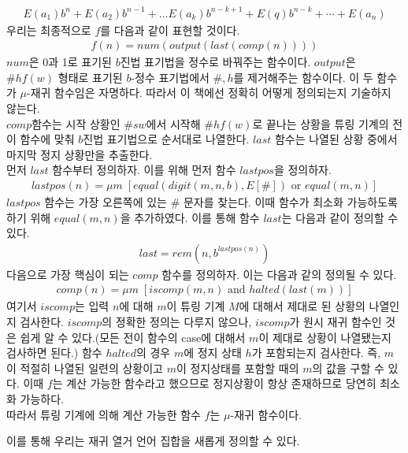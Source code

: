\documentclass[b5paper, 11pt]{book}
\theoremstyle{definition}
\newenvironment{pf*}{\pushQED{\qed}\pf}
{\popQED\endpf}
\begin{document}
\begin{pf*}
    \begin{align*}
        E(a_1)b^n + E(a_2)b^{n-1} + \ldots E(a_k)b^{n-k+1} + E(q)b^{n-k} + \cdots + E(a_n)
    \end{align*}
    우리는 최종적으로 $f$를 다음과 같이 표현할 것이다.
    \begin{align*}
        f(n) = num(output(last(comp(n))))
    \end{align*}
    $num$은 0과 1로 표기된 $b$진법 표기법을 정수로 바꿔주는 함수이다. 
    $output$은 $\# h f(w)$ 형태로 표기된 $b$-정수 표기법에서 $\#, h$를 제거해주는 함수이다.
    이 두 함수가 $\mu$-재귀 함수임은 자명하다. 따라서 이 책에선 정확히 어떻게 정의되는지 기술하지 않는다.\\ 
    $comp$함수는 시작 상황인 $\# s w$에서 시작해 $\# h f(w)$로 끝나는 상황을 튜링 기계의 
    전이 함수에 맞춰 $b$진법 표기법으로 순서대로 나열한다. $last$ 함수는 나열된 상황 중에서 마지막 정지 상황만을
    추출한다. \\ 
    먼저 $last$ 함수부터 정의하자. 이를 위해 먼저 함수 $lastpos$을 정의하자.
    \begin{align*}
        lastpos(n)= \mu m \; [equal(digit(m,n,b),E[\#]) \text{ or } equal(m,n)]
    \end{align*} 
    $lastpos$ 함수는 가장 오른쪽에 있는 $\#$ 문자를 찾는다. 이때 함수가 최소화 가능하도록 하기 위해 $equal(m,n)$을 추가하였다. 이를 통해 함수 $last$는 다음과 같이 정의할 수 있다.
    \begin{align*}
        last = rem(n,b^{lastpos(n)})
    \end{align*}
    다음으로 가장 핵심이 되는 $comp$ 함수를 정의하자. 이는 다음과 같의 정의될 수 있다.
    \begin{align*}
        comp(n) = \mu m \; [iscomp(m,n) \text{ and } halted(last(m))]
    \end{align*}
    여기서 $iscomp$는 입력 $n$에 대해 $m$이 튜링 기계 $M$에 대해서 제대로 된 상황의 나열인지 검사한다. $iscomp$의 정확한 정의는 다루지 않으나, $iscomp$가 원시 재귀 함수인 것은 쉽게 알 수 있다.(모든 전이 함수의 case에 대해서 $m$이 제대로 상황이 나열됐는지 검사하면 된다.) 함수 $halted$의 경우 $m$에 정지 상태 $h$가 포함되는지 검사한다. 즉, $m$이 적절히 나열된 일련의 상황이고 $m$이 정지상태를 포함할 때의 $m$의 값을 구할 수 있다. 이때 $f$는 계산 가능한 함수라고 했으므로 정지상황이 항상 존재하므로 당연히 최소화 가능하다. \\ 
    따라서 튜링 기계에 의해 계산 가능한 함수 $f$는 $\mu$-재귀 함수이다. 
\end{pf*}
이를 통해 우리는 재귀 열거 언어 집합을 새롭게 정의할 수 있다.
\end{document}
